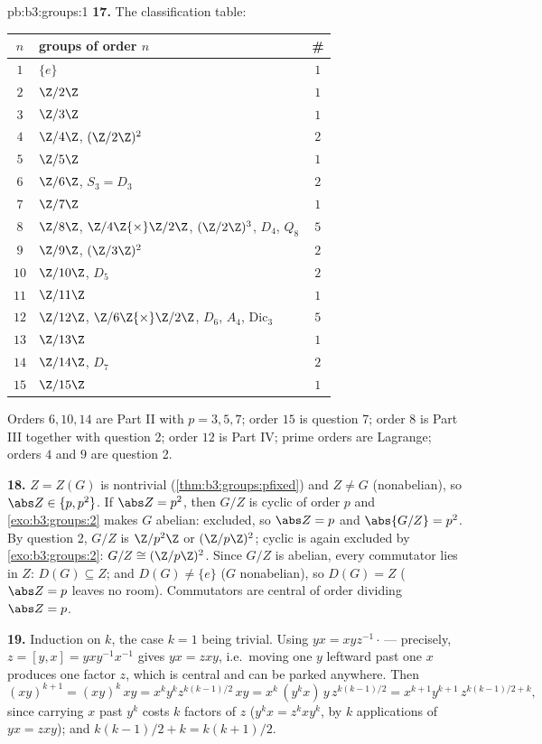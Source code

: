 \begin{solution}{pb:b3:groups:1}
\textbf{17.} The classification table:
\begin{center}
\begin{tabular}{c l c}
$n$ & groups of order $n$ & \#\\
\hline
$1$ & $\{e\}$ & $1$\\
$2$ & $\Z/2\Z$ & $1$\\
$3$ & $\Z/3\Z$ & $1$\\
$4$ & $\Z/4\Z$, $(\Z/2\Z)^2$ & $2$\\
$5$ & $\Z/5\Z$ & $1$\\
$6$ & $\Z/6\Z$, $S_3 = D_3$ & $2$\\
$7$ & $\Z/7\Z$ & $1$\\
$8$ & $\Z/8\Z$, $\Z/4\Z{\times}\Z/2\Z$, $(\Z/2\Z)^3$, $D_4$,
      $Q_8$ & $5$\\
$9$ & $\Z/9\Z$, $(\Z/3\Z)^2$ & $2$\\
$10$ & $\Z/10\Z$, $D_5$ & $2$\\
$11$ & $\Z/11\Z$ & $1$\\
$12$ & $\Z/12\Z$, $\Z/6\Z{\times}\Z/2\Z$, $D_6$, $A_4$,
       $\mathrm{Dic}_3$ & $5$\\
$13$ & $\Z/13\Z$ & $1$\\
$14$ & $\Z/14\Z$, $D_7$ & $2$\\
$15$ & $\Z/15\Z$ & $1$\\
\end{tabular}
\end{center}
Orders $6, 10, 14$ are Part II with $p = 3, 5, 7$; order $15$ is
question 7; order $8$ is Part III together with question 2; order
$12$ is Part IV; prime orders are Lagrange; orders $4$ and $9$
are question 2.

\textbf{18.} $Z = Z(G)$ is nontrivial
(\cref{thm:b3:groups:pfixed}) and $Z \neq G$ (nonabelian), so
$\abs Z \in \{p, p^2\}$. If $\abs Z = p^2$, then $G/Z$ is cyclic
of order $p$ and \cref{exo:b3:groups:2} makes $G$ abelian:
excluded, so $\abs Z = p$ and $\abs{G/Z} = p^2$. By question 2,
$G/Z$ is $\Z/p^2\Z$ or $(\Z/p\Z)^2$; cyclic is again excluded by
\cref{exo:b3:groups:2}: $G/Z \cong (\Z/p\Z)^2$. Since $G/Z$ is
abelian, every commutator lies in $Z$: $D(G) \subseteq Z$; and
$D(G) \neq \{e\}$ ($G$ nonabelian), so $D(G) = Z$ ($\abs Z = p$
leaves no room). Commutators are central of order dividing
$\abs Z = p$.

\textbf{19.} Induction on $k$, the case $k = 1$ being trivial.
Using $yx = xyz^{-1}\cdot$\,--- precisely, $z = [y, x] =
yxy^{-1}x^{-1}$ gives $yx = zxy$, i.e.\ moving one $y$ leftward
past one $x$ produces one factor $z$, which is central and can
be parked anywhere. Then
\[
(xy)^{k+1} = (xy)^k\,xy = x^ky^kz^{k(k-1)/2}\,xy
= x^k\,(y^kx)\,y\,z^{k(k-1)/2}
= x^{k+1}y^{k+1}\,z^{k(k-1)/2 + k},
\]
since carrying $x$ past $y^k$ costs $k$ factors of $z$ ($y^kx =
z^kxy^k$, by $k$ applications of $yx = zxy$); and $k(k-1)/2 + k
= k(k+1)/2$.


\end{solution}
